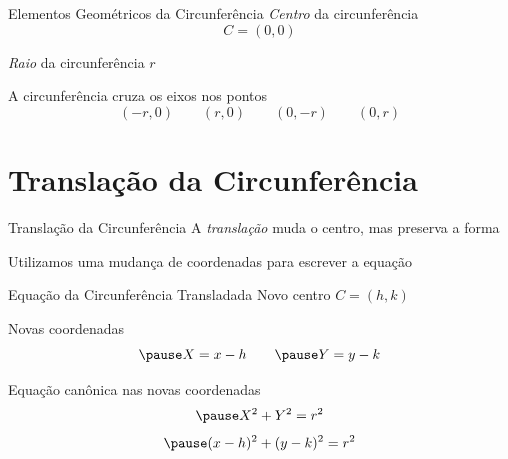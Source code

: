 \documentclass[fleqn,aspectratio=169,12pt]{beamer}
\begin{document}
\begin{frame}{Elementos Geométricos da Circunferência}
  \emph{Centro} da circunferência
  \[
    C = (0, 0)
  \]

  \pause
  \emph{Raio} da circunferência \(r\)

  \pause
  A circunferência cruza os eixos nos pontos
  \[
    (-r, 0) \qquad
    ( r, 0) \qquad
    (0, -r) \qquad
    (0,  r)
  \]
\end{frame}




\section{Translação da Circunferência}

\begin{frame}{Translação da Circunferência}
  A \emph{translação} muda o centro, mas preserva a forma

  \pause
  \bigskip
  Utilizamos uma mudança de coordenadas para escrever a equação
\end{frame}


\begin{frame}{Equação da Circunferência Transladada}
  Novo centro \(C = (h, k)\)

  \pause
  Novas coordenadas
  \[
    \pause
    X = x - h
    \qquad
    \pause
    Y = y - k
  \]

  \pause
  Equação canônica nas novas coordenadas
  \[
    \pause
    X^2 + Y^2 = r^2
  \]
  \[
    \pause
    (x-h)^2 + (y-k)^2 = r^2
  \]
\end{frame}
\end{document}
